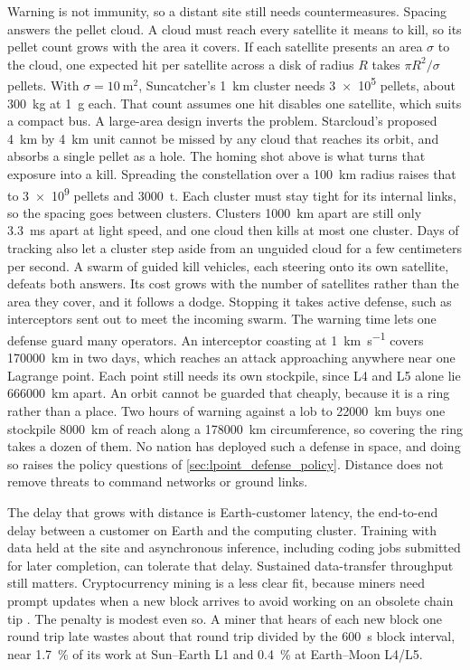 \documentclass{article}
\begin{document}
Warning is not immunity, so a distant site still needs countermeasures. Spacing answers the pellet cloud. A cloud must reach every satellite it means to kill, so its pellet count grows with the area it covers. If each satellite presents an area $\sigma$ to the cloud, one expected hit per satellite across a disk of radius $R$ takes $\pi R^2/\sigma$ pellets. With $\sigma = \SI{10}{\square\meter}$, Suncatcher's \SI{1}{\kilo\meter} cluster \cite{aguera2026_suncatcher} needs \num{3e5} pellets, about \SI{300}{\kilo\gram} at \SI{1}{\gram} each. That count assumes one hit disables one satellite, which suits a compact bus. A large-area design inverts the problem. Starcloud's proposed \SI{4}{\kilo\meter} by \SI{4}{\kilo\meter} unit \cite{nvidia2025_starcloud} cannot be missed by any cloud that reaches its orbit, and absorbs a single pellet as a hole. The homing shot above is what turns that exposure into a kill. Spreading the constellation over a \SI{100}{\kilo\meter} radius raises that to \num{3e9} pellets and \SI{3000}{\tonne}. Each cluster must stay tight for its internal links, so the spacing goes between clusters. Clusters \SI{1000}{\kilo\meter} apart are still only \SI{3.3}{\milli\second} apart at light speed, and one cloud then kills at most one cluster. Days of tracking also let a cluster step aside from an unguided cloud for a few centimeters per second. A swarm of guided kill vehicles, each steering onto its own satellite, defeats both answers. Its cost grows with the number of satellites rather than the area they cover, and it follows a dodge. Stopping it takes active defense, such as interceptors sent out to meet the incoming swarm. The warning time lets one defense guard many operators. An interceptor coasting at \SI{1}{\kilo\meter\per\second} covers \SI{170000}{\kilo\meter} in two days, which reaches an attack approaching anywhere near one Lagrange point. Each point still needs its own stockpile, since L4 and L5 alone lie \SI{666000}{\kilo\meter} apart. An orbit cannot be guarded that cheaply, because it is a ring rather than a place. Two hours of warning against a lob to \SI{22000}{\kilo\meter} buys one stockpile \SI{8000}{\kilo\meter} of reach along a \SI{178000}{\kilo\meter} circumference, so covering the ring takes a dozen of them. No nation has deployed such a defense in space, and doing so raises the policy questions of \autoref{sec:lpoint_defense_policy}. Distance does not remove threats to command networks or ground links.

The delay that grows with distance is Earth-customer latency, the end-to-end delay between a customer on Earth and the computing cluster. Training with data held at the site and asynchronous inference, including coding jobs submitted for later completion, can tolerate that delay. Sustained data-transfer throughput still matters. Cryptocurrency mining is a less clear fit, because miners need prompt updates when a new block arrives to avoid working on an obsolete chain tip \cite{bitcoin_mining_guide}. The penalty is modest even so. A miner that hears of each new block one round trip late wastes about that round trip divided by the \SI{600}{\second} block interval, near \SI{1.7}{\percent} of its work at Sun--Earth L1 and \SI{0.4}{\percent} at Earth--Moon L4/L5.
\end{document}
